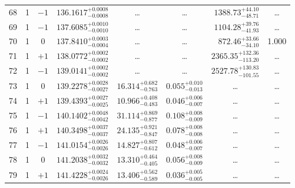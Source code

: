 \begin{table*}[!]
\begin{tabular}{llcrrlrc}
68 & 1 & $-1$ & $    136.1617_{-      0.0008}^{+      0.0008}$ & \multicolumn{1}{c}{\dots} & \multicolumn{1}{c}{\dots} & $     1388.73_{-       48.71}^{+       44.10}$ & \dots\\[1pt]
69 & 1 & $-1$ & $    137.6085_{-      0.0010}^{+      0.0010}$ & \multicolumn{1}{c}{\dots} & \multicolumn{1}{c}{\dots} & $     1104.28_{-       41.93}^{+       39.76}$ & \dots\\[1pt]
70 & 1 & 0& $    137.8410_{-      0.0004}^{+      0.0003}$ & \multicolumn{1}{c}{\dots} & \multicolumn{1}{c}{\dots} & $      872.46_{-       34.10}^{+       33.66}$ & 1.000\\[1pt]
71 & 1 & $+1$ & $    138.0772_{-      0.0002}^{+      0.0002}$ & \multicolumn{1}{c}{\dots} & \multicolumn{1}{c}{\dots} & $     2365.35_{-      113.20}^{+      132.36}$ & \dots \\[1pt]
72 & 1 &$-1$  & $    139.0141_{-      0.0002}^{+      0.0002}$ & \multicolumn{1}{c}{\dots} & \multicolumn{1}{c}{\dots} & $     2527.78_{-      101.55}^{+      130.83}$ & \dots \\[1pt]
73 & 1 & 0 & $    139.2278_{-      0.0027}^{+      0.0028}$ & $      16.314_{-       0.763}^{+       0.682}$ & $       0.055_{-       0.013}^{+       0.010}$ & \multicolumn{1}{c}{\dots} & \dots\\[1pt]
74 & 1 & $+1$ & $    139.4393_{-      0.0025}^{+      0.0027}$ & $      10.966_{-       0.483}^{+       0.408}$ & $       0.046_{-       0.007}^{+       0.006}$ & \multicolumn{1}{c}{\dots} & \dots\\[1pt]
75 & 1 & $-1$ & $    140.1402_{-      0.0042}^{+      0.0048}$ & $      31.114_{-       0.877}^{+       0.869}$ & $       0.108_{-       0.009}^{+       0.008}$ & \multicolumn{1}{c}{\dots} & \dots\\[1pt]
76 & 1 & $+1$ & $    140.3498_{-      0.0037}^{+      0.0037}$ & $      24.135_{-       0.847}^{+       0.921}$ & $       0.078_{-       0.008}^{+       0.008}$ & \multicolumn{1}{c}{\dots} & \dots\\[1pt]
77 & 1 & $-1$ & $    141.0154_{-      0.0026}^{+      0.0026}$ & $      14.827_{-       0.612}^{+       0.807}$ & $       0.048_{-       0.007}^{+       0.006}$ & \multicolumn{1}{c}{\dots} & \dots\\[1pt]
78 & 1 & 0 & $    141.2038_{-      0.0032}^{+      0.0032}$ & $      13.310_{-       0.405}^{+       0.464}$ & $       0.056_{-       0.009}^{+       0.008}$ & \multicolumn{1}{c}{\dots} & \dots\\[1pt]
79 & 1 & $+1$ & $    141.4228_{-      0.0026}^{+      0.0024}$ & $      13.406_{-       0.589}^{+       0.562}$ & $       0.036_{-       0.005}^{+       0.005}$ & \multicolumn{1}{c}{\dots} & \dots\\[1pt]

\end{tabular}
\end{table*}
